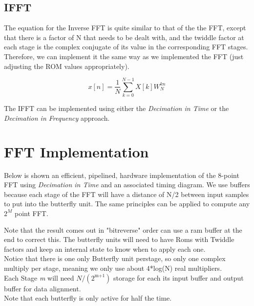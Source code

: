 \documentclass{article}
\begin{document}
\pagebreak

\subsection {IFFT}
The equation for the Inverse FFT is quite similar to that of the the FFT, except that there is a factor of N that needs to be dealt with,
and the twiddle factor at each stage is the complex conjugate of its value in the corresponding FFT stages.
Therefore, we can implement it the same way as we implemented the FFT (just adjusting the ROM values appropriately).

      \begin{equation} x[n] = \frac{1}{N} \sum_{k=0}^{N-1}X[k] W_{N}^{kn} \end{equation}

The IFFT can be implemented using either the \emph{Decimation in Time} or the \emph{Decimation in Frequency} approach.

\pagebreak
\section{FFT Implementation}

Below is shown an efficient, pipelined, hardware implementation of the 8-point FFT using \emph{Decimation in Time}
and an associated timing diagram.
We use buffers because each stage of the FFT will have a distance of N/2 between input samples to put into the butterfly unit.
The same principles can be applied to compute any $2^{M}$ point FFT.

Note that the result comes out in "bitreverse" order can use a ram buffer at the end to correct this.
The butterfly units will need to have Roms with Twiddle factors and keep an internal state to know when to apply each one. \\
Notice that there is one only Butterfly unit perstage, so only one complex multiply per stage, meaning we only use about 4*log(N) real multipliers. \\
Each Stage \emph{m} will need $N/(2^{\text{m+1}})$ storage for each its input buffer and output buffer for data alignment. \\
Note that each butterfly is only active for half the time.
\end{document}
